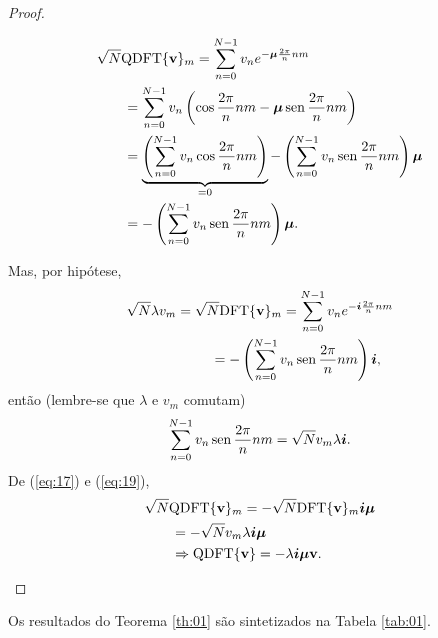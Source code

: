 \begin{proof}
\begin{itemize}
\begin{equation}
\begin{aligned}
		\sqrt{N} \text{QDFT}\{ \mathbf{v} \}_m &= \sum_{n=0}^{N-1} v_n e^{-\qmu \frac{2\pi}{n} nm}\\
		&\hspace{\correctinghspace}
		=
		\sum_{n=0}^{N-1} v_n \left( \cos \frac{2\pi}{n} nm - \qmu \mathrm{\,sen\,} \frac{2\pi}{n} nm \right) \\
		&\hspace{\correctinghspace}
		= {\underbrace{\left( \sum_{n=0}^{N-1} v_n \cos \frac{2\pi}{n} nm \right)}_{=0} - \left(  \sum_{n=0}^{N-1} v_n \mathrm{\,sen\,} \frac{2\pi}{n} nm \right) \qmu }\\
		&\hspace{\correctinghspace}
		= - \left(  \sum_{n=0}^{N-1} v_n \mathrm{\,sen\,} \frac{2\pi}{n} nm \right) \qmu.
		\end{aligned}
		\end{equation}
		
		Mas, por hip\'otese,
		\begin{equation}
		\begin{aligned}
		\sqrt{N}\lambda v_m = \sqrt{N}\text{DFT}\{ \mathbf{v} \}_m &= \sum_{n=0}^{N-1} v_n e^{-\qi \frac{2\pi}{n} nm}\\
		&\hspace{\correctinghspace}
		= - \left(  \sum_{n=0}^{N-1} v_n \mathrm{\,sen\,} \frac{2\pi}{n} nm \right) \qi,
		\end{aligned}
		\end{equation}
		ent\~ao (lembre-se que $ \lambda $ e $ v_m $ comutam)
		\begin{equation}
		\label{eq:19}
		\sum_{n=0}^{N-1} v_n \mathrm{\,sen\,} \frac{2\pi}{n} nm = \sqrt{N}v_m \lambda \boldsymbol{i}.
		\end{equation}
		De (\ref{eq:17}) e (\ref{eq:19}),
		\begin{equation}
		\label{eq:20}
		\begin{aligned}
		\sqrt{N}\text{QDFT}\{ \mathbf{v} \}_m &=  -\sqrt{N}\text{DFT} \{ \mathbf{v} \}_m \qi \qmu \\
		&\hspace{\correctinghspace}
		= -\sqrt{N}v_m \lambda \qi \qmu \\
		&\hspace{\correctinghspace}
		\Rightarrow \text{QDFT}\{ \mathbf{v} \} = -\lambda \qi \qmu \mathbf{v}.
		\end{aligned}
		\end{equation}
	\end{itemize}
\end{proof}
Os resultados do Teorema \ref{th:01} s\~ao sintetizados na Tabela \ref{tab:01}.

